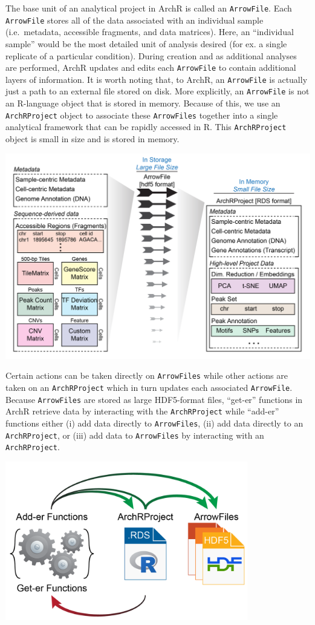 \documentclass[
  12pt,
]{krantz}
\begin{document}
The base unit of an analytical project in ArchR is called an \texttt{ArrowFile}. Each \texttt{ArrowFile} stores all of the data associated with an individual sample (i.e.~metadata, accessible fragments, and data matrices). Here, an ``individual sample'' would be the most detailed unit of analysis desired (for ex. a single replicate of a particular condition). During creation and as additional analyses are performed, ArchR updates and edits each \texttt{ArrowFile} to contain additional layers of information.
It is worth noting that, to ArchR, an \texttt{ArrowFile} is actually just a path to an external file stored on disk. More explicitly, an \texttt{ArrowFile} is not an R-language object that is stored in memory. Because of this, we use an \texttt{ArchRProject} object to associate these \texttt{ArrowFiles} together into a single analytical framework that can be rapidly accessed in R. This \texttt{ArchRProject} object is small in size and is stored in memory.

\includegraphics[width=7.29167in,height=\textheight]{images/ArchRProject_Schematic.png}

Certain actions can be taken directly on \texttt{ArrowFiles} while other actions are taken on an \texttt{ArchRProject} which in turn updates each associated \texttt{ArrowFile}. Because \texttt{ArrowFiles} are stored as large HDF5-format files, ``get-er'' functions in ArchR retrieve data by interacting with the \texttt{ArchRProject} while ``add-er'' functions either (i) add data directly to \texttt{ArrowFiles}, (ii) add data directly to an \texttt{ArchRProject}, or (iii) add data to \texttt{ArrowFiles} by interacting with an \texttt{ArchRProject}.

\includegraphics[width=4.16667in,height=\textheight]{images/ArchR_FunctionSchematic.png}
\end{document}
